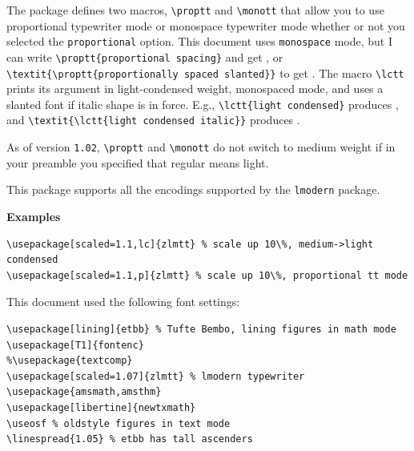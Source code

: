 \documentclass[11pt]{article}
\begin{document}
The package defines two macros, \verb|\proptt| and \verb|\monott| that allow you to use proportional typewriter mode or monospace typewriter mode whether or not you selected the {\tt proportional} option. This document uses {\tt monospace} mode, but I can write \verb|\proptt{proportional spacing}| and get , or \verb|\textit{\proptt{proportionally spaced slanted}}| to get \textit{}. The macro \verb|\lctt| prints its argument in light-condensed weight, monospaced mode, and uses a slanted font if italic shape is in force. E.g., \verb|\lctt{light condensed}| produces , and \verb|\textit{\lctt{light condensed italic}}| produces \textit{}.

As of version {\tt 1.02}, \verb|\proptt| and \verb|\monott| do not switch to medium weight if in your preamble you specified that regular means light.

This package supports all the encodings supported by the {\tt lmodern} package.

{\bf Examples}
\begin{verbatim}
\usepackage[scaled=1.1,lc]{zlmtt} % scale up 10\%, medium->light condensed
\usepackage[scaled=1.1,p]{zlmtt} % scale up 10\%, proportional tt mode
\end{verbatim}
This document used the following font settings:
\begin{verbatim}
\usepackage[lining]{etbb} % Tufte Bembo, lining figures in math mode
\usepackage[T1]{fontenc}
%\usepackage{textcomp}
\usepackage[scaled=1.07]{zlmtt} % lmodern typewriter
\usepackage{amsmath,amsthm}
\usepackage[libertine]{newtxmath}
\useosf % oldstyle figures in text mode
\linespread{1.05} % etbb has tall ascenders
\end{verbatim}
\end{document}
